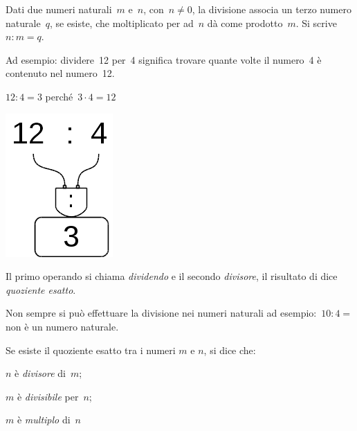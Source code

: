 \begin{definizione}
Dati due numeri naturali~\(m\) e~\(n\), con~\(n \neq 0\), la divisione associa 
un terzo numero naturale~\(q\), se esiste, che moltiplicato per ad~\(n\) dà 
come prodotto~\(m\).
Si scrive~\(n : m = q\).
\end{definizione}

Ad esempio: dividere~12 per~4 significa trovare quante volte il numero~4 è 
contenuto nel numero~12.

\begin{minipage}{0.80\textwidth}
 \centering
 \(12 : 4 = 3\) perché~\(3 \cdot 4 = 12\)

% 
\end{minipage}%
\begin{minipage}{0.15\textwidth}
 \centering
\begin{inaccessibleblock}[]
 \includegraphics[scale=0.35]{img/op_div.png}
\end{inaccessibleblock}
\end{minipage}%

Il primo operando si chiama \emph{dividendo} e il secondo \emph{divisore}, 
il risultato di dice \emph{quoziente esatto}.

Non sempre si può effettuare la divisione nei numeri naturali ad 
esempio:~\(10 : 4 =\) non è un numero naturale.

Se esiste il quoziente esatto tra i numeri \(m\) e \(n\), si dice che:

\begin{multicols}{3}
\begin{itemize*}
 \item \(n\) è \emph{divisore} di~\(m\);
 \item \(m\) è \emph{divisibile} per~\(n\);
 \item \(m\) è \emph{multiplo} di~\(n\)
\end{itemize*}
\end{multicols}

